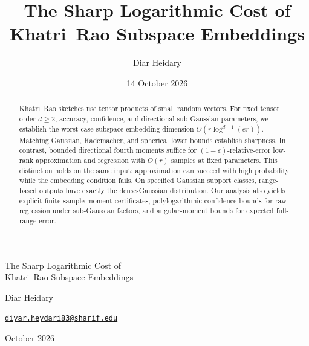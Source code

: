 \documentclass[11pt,a4paper]{article}
\title{The Sharp Logarithmic Cost of Khatri--Rao Subspace Embeddings}
\author{Diar Heidary}
\date{14 October 2026}
\theoremstyle{definition}\newtheorem{definition}[theorem]{Definition}
\theoremstyle{remark}\newtheorem{remark}[theorem]{Remark}
\numberwithin{equation}{section}
\begin{document}
\thispagestyle{plain}
{\centering\LARGE The Sharp Logarithmic Cost of\\[3pt]
Khatri--Rao Subspace Embeddings\par}
\vspace{12pt}
\begingroup
\renewcommand{\thefootnote}{\ensuremath{\ast}}
{\centering\large Diar Heidary\footnotemark[1]\par}
\endgroup
\vspace{3pt}
{\centering\href{mailto:diyar.heydari83@sharif.edu}{\texttt{diyar.heydari83@sharif.edu}}\par}

\vspace{8pt}
{ October 2026\par}
\vspace{17pt}
\begingroup\setlength{\fboxsep}{9pt}\setlength{\fboxrule}{.7pt}
\noindent{}
\endgroup
\vspace{13pt}
\begin{abstract}
Khatri--Rao sketches use tensor products of small random vectors.
For fixed tensor order $d\ge2$, accuracy, confidence, and directional
sub-Gaussian parameters, we establish the worst-case subspace embedding
dimension $\Theta(r\log^{d-1}(er))$. Matching Gaussian, Rademacher,
and spherical lower bounds establish sharpness. In contrast, bounded
directional fourth moments suffice for $(1+\varepsilon)$-relative-error
low-rank approximation and regression with $O(r)$ samples at fixed
parameters. This distinction holds on the same input: approximation
can succeed with high probability while the embedding condition fails.
On specified Gaussian support classes, range-based outputs have exactly
the dense-Gaussian distribution. Our analysis also yields explicit
finite-sample moment certificates, polylogarithmic confidence bounds
for raw regression under sub-Gaussian factors, and angular-moment
bounds for expected full-range error.
\end{abstract}
\end{document}
